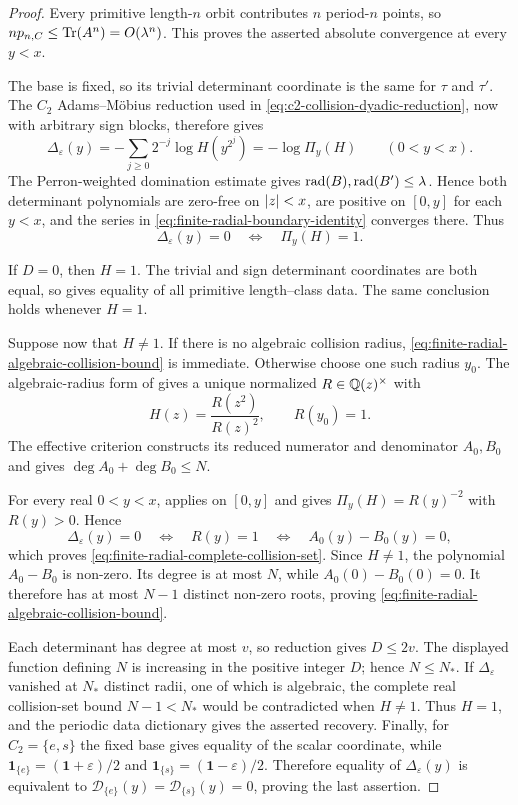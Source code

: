 \begin{proof}
Every primitive length-\(n\) orbit contributes \(n\) period-\(n\) points, so
\(np_{n,C}\le\operatorname{Tr}(A^n)=O(\lambda^n)\).  This proves the asserted absolute
convergence at every \(y<x\).

The base is fixed, so its trivial determinant coordinate is the same for
\(\tau\) and \(\tau'\).  The \(C_2\) Adams--M\"obius reduction used in
\eqref{eq:c2-collision-dyadic-reduction}, now with arbitrary sign blocks,
therefore gives
\begin{equation}\label{eq:finite-radial-boundary-identity}
 \Delta_\varepsilon(y)
 =-\sum_{j\ge0}2^{-j}\log H(y^{2^j})
 =-\log\Pi_y(H)
 \qquad(0<y<x).
\end{equation}
The Perron-weighted domination estimate gives
\(\operatorname{rad}(B),\operatorname{rad}(B')\le\lambda\).  Hence both determinant polynomials are
zero-free on \(\lvert z \rvert<x\), are positive on \([0,y]\) for each \(y<x\), and
the series in \eqref{eq:finite-radial-boundary-identity} converges there.
Thus
\[
 \Delta_\varepsilon(y)=0\quad\Longleftrightarrow\quad\Pi_y(H)=1.
\]

If \(D=0\), then \(H=1\).  The trivial and sign determinant coordinates are
both equal, so  gives equality of all
primitive length--class data.  The same conclusion holds whenever \(H=1\).

Suppose now that \(H\ne1\).  If there is no algebraic collision radius,
\eqref{eq:finite-radial-algebraic-collision-bound} is immediate.  Otherwise
choose one such radius \(y_0\).  The algebraic-radius form of
 gives a unique normalized
\(R\in\mathbb{Q}(z)^\times\) with
\[
 H(z)=\frac{R(z^2)}{R(z)^2},
 \qquad R(y_0)=1.
\]
The effective criterion constructs its reduced numerator and denominator
\(A_0,B_0\) and gives \(\deg A_0+\deg B_0\le N\).

For every real \(0<y<x\),
 applies on \([0,y]\) and gives
\(\Pi_y(H)=R(y)^{-2}\) with \(R(y)>0\).  Hence
\[
 \Delta_\varepsilon(y)=0
 \quad\Longleftrightarrow\quad
 R(y)=1
 \quad\Longleftrightarrow\quad
 A_0(y)-B_0(y)=0,
\]
which proves \eqref{eq:finite-radial-complete-collision-set}.  Since \(H\ne1\),
the polynomial \(A_0-B_0\) is non-zero.  Its degree is at most \(N\), while
\(A_0(0)-B_0(0)=0\).  It therefore has at most \(N-1\) distinct non-zero
roots, proving \eqref{eq:finite-radial-algebraic-collision-bound}.

Each determinant has degree at most \(v\), so reduction gives \(D\le2v\).
The displayed function defining \(N\) is increasing in the positive integer
\(D\); hence \(N\le N_*\).  If \(\Delta_\varepsilon\) vanished at \(N_*\)
distinct radii, one of which is algebraic, the complete real collision-set
bound \(N-1<N_*\) would be contradicted when \(H\ne1\).  Thus \(H=1\), and
the periodic data dictionary gives the
asserted recovery.  Finally, for \(C_2=\{e,s\}\)
the fixed base gives equality of the scalar coordinate, while
\(\mathbf1_{\{e\}}=(\mathbf1+\varepsilon)/2\) and
\(\mathbf1_{\{s\}}=(\mathbf1-\varepsilon)/2\).  Therefore equality of
\(\Delta_\varepsilon(y)\) is equivalent to
\(\mathcal D_{\{e\}}(y)=\mathcal D_{\{s\}}(y)=0\), proving the last
assertion.


\end{proof}
